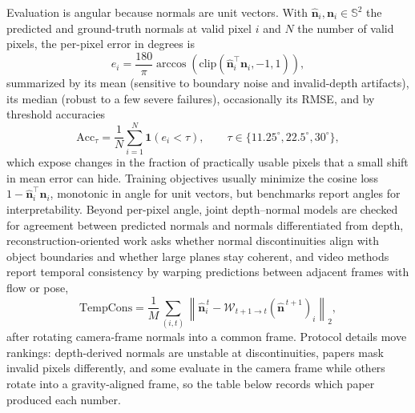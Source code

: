 Evaluation is angular because normals are unit vectors.
With $\hat{\mathbf{n}}_i,\mathbf{n}_i\in\mathbb{S}^2$ the predicted and ground-truth normals at valid pixel $i$ and $N$ the number of valid pixels, the per-pixel error in degrees is
\begin{equation}
   e_i = \frac{180}{\pi}\arccos\!\left(\mathrm{clip}(\hat{\mathbf{n}}_i^\top \mathbf{n}_i,-1,1)\right),
\end{equation}
summarized by its mean (sensitive to boundary noise and invalid-depth artifacts), its median (robust to a few severe failures), occasionally its RMSE, and by threshold accuracies
\begin{equation}
    \mathrm{Acc}_{\tau} = \frac{1}{N}\sum_{i=1}^{N}\mathbf{1}(e_i < \tau),
    \qquad \tau\in\{11.25^\circ,22.5^\circ,30^\circ\},
\end{equation}
which expose changes in the fraction of practically usable pixels that a small shift in mean error can hide.
Training objectives usually minimize the cosine loss $1-\hat{\mathbf{n}}_i^\top\mathbf{n}_i$, monotonic in angle for unit vectors, but benchmarks report angles for interpretability.
Beyond per-pixel angle, joint depth--normal models are checked for agreement between predicted normals and normals differentiated from depth, reconstruction-oriented work asks whether normal discontinuities align with object boundaries and whether large planes stay coherent, and video methods report temporal consistency by warping predictions between adjacent frames with flow or pose,
\begin{equation}
    \mathrm{TempCons} = \frac{1}{M}\sum_{(i,t)}
    \left\|\hat{\mathbf{n}}_{i}^{\,t} -
    \mathcal{W}_{t+1\rightarrow t}(\hat{\mathbf{n}}^{\,t+1})_i\right\|_2,
\end{equation}
after rotating camera-frame normals into a common frame.
Protocol details move rankings: depth-derived normals are unstable at discontinuities, papers mask invalid pixels differently, and some evaluate in the camera frame while others rotate into a gravity-aligned frame, so the table below records which paper produced each number.

